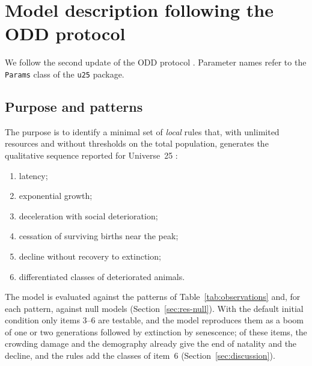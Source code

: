 \section{Model description following the ODD protocol}
\label{app:odd}

We follow the second update of the ODD protocol \cite{Grimm2020}.
Parameter names refer to the \texttt{Params} class of the \texttt{u25} package.

\subsection{Purpose and patterns}
The purpose is to identify a minimal set of \emph{local} rules that, with unlimited resources and without thresholds
on the total population, generates the qualitative sequence reported for Universe~25 \cite{Calhoun1973}:
\begin{enumerate}
\item latency;
\item exponential growth;
\item deceleration with social deterioration;
\item cessation of surviving births near the peak;
\item decline without recovery to extinction;
\item differentiated classes of deteriorated animals.
\end{enumerate}
The model is evaluated against the patterns of Table~\ref{tab:observations} and, for each pattern, against null
models (Section~\ref{sec:res-null}). With the default initial condition only items 3--6 are testable, and the model
reproduces them as a boom of one or two generations followed by extinction by senescence; of these items, the
crowding damage and the demography already give the end of natality and the decline, and the rules add the
classes of item~6 (Section~\ref{sec:discussion}).

